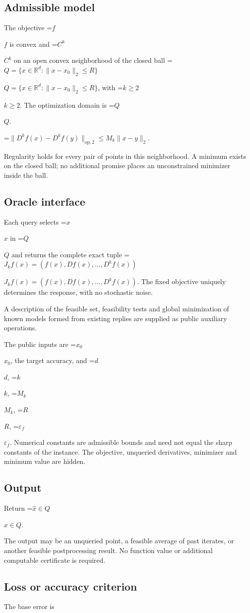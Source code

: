 \documentclass[10pt,a4paper]{article}
\newcommand{\AtlasMath}[1]{\par\begingroup\centering\setbox0=\hbox{$\displaystyle #1$}\ifdim\wd0>1.4\linewidth\typeout{ATLAS WIDE FORMULA: \the\wd0}\fi\ifdim\wd0>\linewidth\resizebox{\linewidth}{!}{\box0}\else\box0\fi\par\endgroup}
\newcommand{\AtlasInlineMath}[1]{\begingroup\setbox0=\hbox{$#1$}\ifdim\wd0>.4\linewidth\endgroup\AtlasMath{#1}\else\endgroup$#1$\fi}
\begin{document}
\subsection{Admissible model}
The objective \AtlasInlineMath{f} is convex and \AtlasInlineMath{C^k} on an open convex neighborhood of the closed ball \AtlasInlineMath{Q=\{x\in\mathbb{R}^d:\|x-x_0\|_2\le R\}}, with \AtlasInlineMath{k\ge2}. The optimization domain is \AtlasInlineMath{Q}.


\AtlasMath{\|D^{k}f(x)-D^{k}f(y)\|_{\mathrm{op},2}\le M_k\|x-y\|_{2}.}


Regularity holds for every pair of points in this neighborhood. A minimum exists on the closed ball; no additional promise places an unconstrained minimizer inside the ball.

\subsection{Oracle interface}
Each query selects \AtlasInlineMath{x} in \AtlasInlineMath{Q} and returns the complete exact tuple \AtlasInlineMath{J_{k}f(x)=(f(x),Df(x),\ldots,D^{k}f(x))}. The fixed objective uniquely determines the response, with no stochastic noise.

A description of the feasible set, feasibility tests and global minimization of known models formed from existing replies are supplied as public auxiliary operations.

The public inputs are \AtlasInlineMath{x_0}, the target accuracy, and \AtlasInlineMath{d}, \AtlasInlineMath{k}, \AtlasInlineMath{M_k}, \AtlasInlineMath{R}, \AtlasInlineMath{\varepsilon_f}. Numerical constants are admissible bounds and need not equal the sharp constants of the instance. The objective, unqueried derivatives, minimizer and minimum value are hidden.

\subsection{Output}
Return \AtlasInlineMath{\widehat{x}\in Q}.

The output may be an unqueried point, a feasible average of past iterates, or another feasible postprocessing result. No function value or additional computable certificate is required.

\subsection{Loss or accuracy criterion}
The base error is
\end{document}
